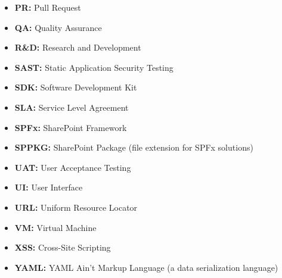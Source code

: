 \begin{itemize}
    \item \textbf{PR:} Pull Request
    \item \textbf{QA:} Quality Assurance
    \item \textbf{R\&D:} Research and Development
    \item \textbf{SAST:} Static Application Security Testing
    \item \textbf{SDK:} Software Development Kit
    \item \textbf{SLA:} Service Level Agreement
    \item \textbf{SPFx:} SharePoint Framework
    \item \textbf{SPPKG:} SharePoint Package (file extension for SPFx solutions)
    \item \textbf{UAT:} User Acceptance Testing
    \item \textbf{UI:} User Interface
    \item \textbf{URL:} Uniform Resource Locator
    \item \textbf{VM:} Virtual Machine
    \item \textbf{XSS:} Cross-Site Scripting
    \item \textbf{YAML:} YAML Ain't Markup Language (a data serialization language)
\end{itemize}